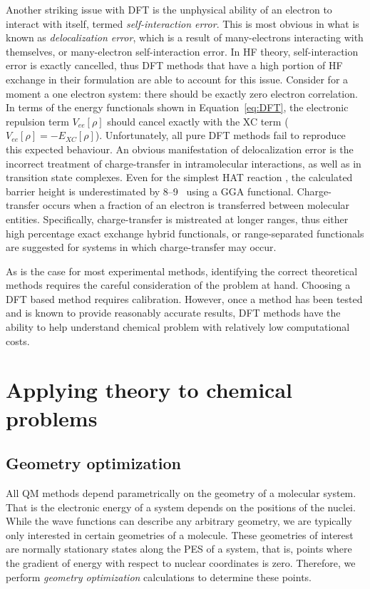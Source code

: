 \begin{doublespace}
Another striking issue with DFT is the unphysical ability of an electron to
interact with itself, termed \emph{self-interaction error}. This is most
obvious in what is known as \emph{delocalization error}, which is a result of
many-electrons interacting with themselves, or many-electron self-interaction
error. In HF theory, self-interaction error is exactly cancelled, thus DFT
methods that have a high portion of HF exchange in their formulation are able
to account for this issue. Consider for a moment a one electron system: there
should be exactly zero electron correlation. In terms of the energy functionals
shown in Equation~\ref{eq:DFT}, the electronic repulsion term $V_{ee}[\rho]$
should cancel exactly with the XC term ($V_{ee}[\rho] =
-E_{XC}[\rho]$).\cite{Cramer2004} Unfortunately, all pure DFT methods fail to
reproduce this expected behaviour. An obvious manifestation of delocalization
error is the incorrect treatment of charge-transfer in intramolecular
interactions,\cite{MoriSanchez2008,OterodelaRoza2014} as well as in transition
state complexes. Even for the simplest HAT reaction ,
the calculated barrier height is underestimated by 8--9 \kcalmol\ using a GGA
functional.\cite{Csonka1998} Charge-transfer occurs when a fraction of an
electron is transferred between molecular entities. Specifically,
charge-transfer is mistreated at longer ranges, thus either high percentage
exact exchange hybrid functionals, or range-separated functionals are suggested
for systems in which charge-transfer may occur.

As is the case for most experimental methods, identifying the correct
theoretical methods requires the careful consideration of the problem at hand.
Choosing a DFT based method requires calibration. However, once a method has
been tested and is known to provide reasonably accurate results, DFT methods
have the ability to help understand chemical problem with relatively low
computational costs.

\section{Applying theory to chemical problems}

\subsection{Geometry optimization}

All QM methods depend parametrically on the geometry of a molecular system. That
is the electronic energy of a system depends on the positions of the nuclei.
While the wave functions can describe any arbitrary geometry, we are typically
only interested in certain geometries of a molecule. These geometries of
interest are normally stationary states along the PES of a system, that is,
points where the gradient of energy with respect to nuclear coordinates is zero.
Therefore, we perform \emph{geometry optimization} calculations to determine
these points.


\end{doublespace}
